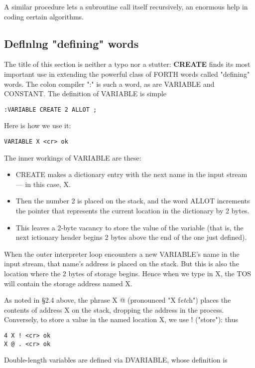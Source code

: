 A similar procedure lets a subroutine call itself recursively, an enormous help in coding certain algorithms.

\subsection{Deﬂnlng "defining" words}

The title of this section is neither a typo nor a stutter: \textbf{CREATE} finds its most important use in extending the powerful class of FORTH words called "defining" words. The colon compiler ":" is such a word, as are VARIABLE and CONSTANT. The definition of VARIABLE is simple

\begin{lstlisting}
:VARIABLE CREATE 2 ALLOT ;
\end{lstlisting}

Here is how we use it:
\begin{lstlisting}
VARIABLE X <cr> ok
\end{lstlisting}

The inner workings of VARIABLE are these:
\begin{itemize}
    \item CREATE makes a dictionary entry with the next name in the input stream — in this case, X.
    \item Then the number 2 is placed on the stack, and the word ALLOT increments the pointer that represents the current location in the dictionary by 2 bytes.
    \item This leaves a 2-byte vacancy to store the value of the variable (that is, the next ictionary header begins 2 bytes above the end of the one just defined).
\end{itemize}

When the outer interpreter loop encounters a new VARIABLE's name in the input stream, that name’s address is placed on the stack. But this is also the location where the 2 bytes of storage begins. Hence when we type in X, the TOS will contain the storage address named X.

As noted in §2.4 above, the phrase X @ (pronounced "X f\textit{etc}h") places the contents of address X on the stack, dropping the address in the process. Conversely, to store a value in the named location X, we use ! ("store"): thus
\begin{lstlisting}
4 X ! <cr> ok
X @ . <cr> ok
\end{lstlisting}

Double-length variables are defined via DVARIABLE, whose definition is


